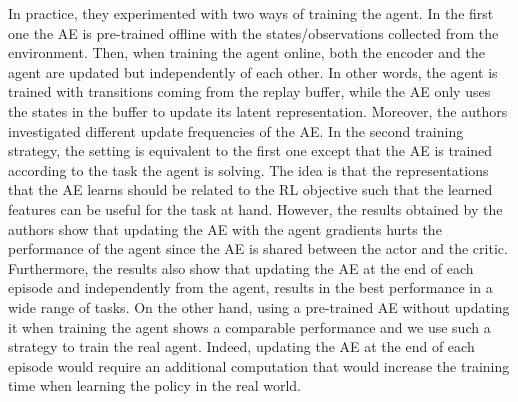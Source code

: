 In practice, they experimented with two ways of training the agent. In the first one the AE is pre-trained offline with the states/observations collected from the environment. Then, when training the agent online, both the encoder and the agent are updated but independently of each other. In other words, the agent is trained with transitions coming from the replay buffer, while the AE only uses the states in the buffer to update its latent representation. Moreover, the authors investigated different update frequencies of the AE.
In the second training strategy, the setting is equivalent to the first one except that the AE is trained according to the task the agent is solving. The idea is that the representations that the AE learns should be related to the RL objective such that the learned features can be useful for the task at hand. However, the results obtained by the authors show that updating the AE with the agent gradients hurts the performance of the agent since the AE is shared between the actor and the critic.
Furthermore, the results also show that updating the AE at the end of each episode and independently from the agent, results in the best performance in a wide range of tasks. On the other hand, using a pre-trained AE without updating it when training the agent shows a comparable performance and we use such a strategy to train the real agent. Indeed, updating the AE at the end of each episode would require an additional computation that would increase the training time when learning the policy in the real world.


